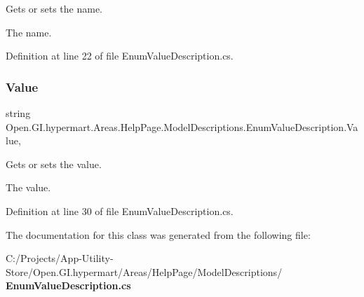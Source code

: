 Gets or sets the name. 

The name. 

Definition at line 22 of file Enum\+Value\+Description.\+cs.

\mbox{\label{class_open_1_1_g_i_1_1hypermart_1_1_areas_1_1_help_page_1_1_model_descriptions_1_1_enum_value_description_ab94229a6c9c5afad58abc04d705169f8}} 
\subsubsection{Value}
{\footnotesize\ttfamily string Open.\+G\+I.\+hypermart.\+Areas.\+Help\+Page.\+Model\+Descriptions.\+Enum\+Value\+Description.\+Value\hspace{0.3cm}{\ttfamily [get]}, {\ttfamily [set]}}



Gets or sets the value. 

The value. 

Definition at line 30 of file Enum\+Value\+Description.\+cs.



The documentation for this class was generated from the following file\+:\begin{DoxyCompactItemize}
\item 
C\+:/\+Projects/\+App-\/\+Utility-\/\+Store/\+Open.\+G\+I.\+hypermart/\+Areas/\+Help\+Page/\+Model\+Descriptions/\textbf{ Enum\+Value\+Description.\+cs}\end{DoxyCompactItemize}

